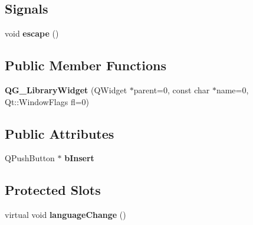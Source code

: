 \subsection*{Signals}
\begin{DoxyCompactItemize}
\item 
\hypertarget{classQG__LibraryWidget_a4db17b775704bcaaf7248abfd81a9e7b}{void {\bfseries escape} ()}\label{classQG__LibraryWidget_a4db17b775704bcaaf7248abfd81a9e7b}

\end{DoxyCompactItemize}
\subsection*{Public Member Functions}
\begin{DoxyCompactItemize}
\item 
\hypertarget{classQG__LibraryWidget_a0a6a4deaa30e367f2e1b83b2606f2b3e}{{\bfseries Q\-G\-\_\-\-Library\-Widget} (Q\-Widget $\ast$parent=0, const char $\ast$name=0, Qt\-::\-Window\-Flags fl=0)}\label{classQG__LibraryWidget_a0a6a4deaa30e367f2e1b83b2606f2b3e}

\end{DoxyCompactItemize}
\subsection*{Public Attributes}
\begin{DoxyCompactItemize}
\item 
\hypertarget{classQG__LibraryWidget_ad685fd31fa5f2188082709eb78b56472}{Q\-Push\-Button $\ast$ {\bfseries b\-Insert}}\label{classQG__LibraryWidget_ad685fd31fa5f2188082709eb78b56472}

\end{DoxyCompactItemize}
\subsection*{Protected Slots}
\begin{DoxyCompactItemize}
\item 
\hypertarget{classQG__LibraryWidget_adb9cae0a46de4b34800c27c56c9119e1}{virtual void {\bfseries language\-Change} ()}\label{classQG__LibraryWidget_adb9cae0a46de4b34800c27c56c9119e1}

\end{DoxyCompactItemize}


